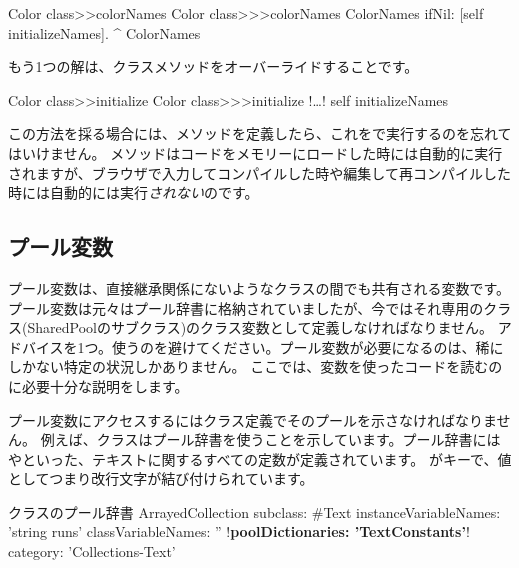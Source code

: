 \documentclass[a4paper,10pt,twoside]{book}
\begin{document}
\begin{method}[colorclasscolornames]{Color class>>colorNames}
Color class>>>colorNames	
	ColorNames ifNil: [self initializeNames].
	^ ColorNames
\end{method}	

もう1つの解は、クラスメソッドをオーバーライドすることです。

\begin{method}[colorclassinit]{Color class>>initialize}
Color class>>>initialize	
	!\ldots!
	self initializeNames
\end{method}	

\noindent
この方法を採る場合には、メソッドを定義したら、これをで実行するのを忘れてはいけません。
 メソッドはコードをメモリーにロードした時には自動的に実行されますが、ブラウザで入力してコンパイルした時や編集して再コンパイルした時には自動的には実行\emph{されない}のです。

\subsection{プール変数}
プール変数は、直接継承関係にないようなクラスの間でも共有される変数です。
プール変数は元々はプール辞書に格納されていましたが、今ではそれ専用のクラス(SharedPoolのサブクラス)のクラス変数として定義しなければなりません。
アドバイスを1つ。使うのを避けてください。プール変数が必要になるのは、稀にしかない特定の状況しかありません。
ここでは、変数を使ったコードを読むのに必要十分な説明をします。

プール変数にアクセスするにはクラス定義でそのプールを示さなければなりません。
例えば、クラスはプール辞書を使うことを示しています。プール辞書にはやといった、テキストに関するすべての定数が定義されています。
がキーで、値としてつまり改行文字が結び付けられています。

\begin{classdef}[textpooldict]{クラスのプール辞書}
ArrayedCollection subclass: #Text
        instanceVariableNames: 'string runs' 	
        classVariableNames: '' 	
        !\textbf{poolDictionaries: 'TextConstants'}!
        category: 'Collections-Text'
\end{classdef}
   
\end{document}
